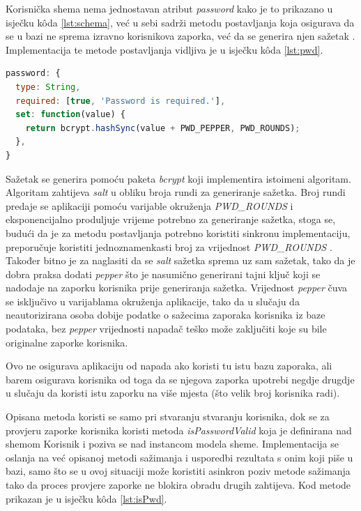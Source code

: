 \documentclass[times, utf8, diplomski, numeric]{fer}
\newcommand{\razmakp}{\vspace{18pt}}
\newcommand{\razmaks}{\vspace{10pt}}
\begin{document}
Korisnička shema nema jednostavan atribut \emph{password} kako je to prikazano u isječku kôda \ref{lst:schema}, već u sebi sadrži metodu postavljanja  koja osigurava da se u bazi ne sprema izravno korisnikova zaporka, već da se generira njen sažetak .
Implementacija te metode postavljanja vidljiva je u isječku kôda \ref{lst:pwd}.

\razmakp %
\begin{lstlisting}[language=JavaScript, caption={Attribut \emph{password} od sheme Korisnik}, label={lst:pwd}]
password: {
  type: String,
  required: [true, 'Password is required.'],
  set: function(value) {
    return bcrypt.hashSync(value + PWD_PEPPER, PWD_ROUNDS);
  },
}
\end{lstlisting}
\razmaks

Sažetak se generira pomoću paketa \emph{bcrypt} koji implementira istoimeni algoritam.
Algoritam zahtijeva \emph{salt} u obliku broja rundi za generiranje sažetka.
Broj rundi predaje se aplikaciji pomoću varijable okruženja \emph{PWD\_ROUNDS} i eksponencijalno produljuje vrijeme potrebno za generiranje sažetka, stoga se, budući da je za metodu postavljanja potrebno koristiti sinkronu implementaciju, preporučuje koristiti jednoznamenkasti broj za vrijednost \emph{PWD\_ROUNDS} \citep{bcrypt}.
Također bitno je za naglasiti da se \emph{salt} sažetka sprema uz sam sažetak, tako da je dobra praksa dodati \emph{pepper} što je nasumično generirani tajni ključ koji se nadodaje na zaporku korisnika prije generiranja sažetka.
Vrijednost \emph{pepper} čuva se isključivo u varijablama okruženja aplikacije, tako da u slučaju da neautorizirana osoba dobije podatke o sažecima zaporaka korisnika iz baze podataka, bez \emph{pepper} vrijednosti napadač teško može zaključiti koje su bile originalne zaporke korisnika.

Ovo ne osigurava aplikaciju od napada ako koristi tu istu bazu zaporaka, ali barem osigurava korisnika od toga da se njegova zaporka upotrebi negdje drugdje u slučaju da koristi istu zaporku na više mjesta (što velik broj korisnika radi).

\razmakp

Opisana metoda koristi se samo pri stvaranju stvaranju korisnika, dok se za provjeru zaporke korisnika koristi metoda \emph{isPasswordValid} koja je definirana nad shemom Korisnik i poziva se nad instancom modela sheme.
Implementacija se oslanja na već opisanoj metodi sažimanja i usporedbi rezultata s onim koji piše u bazi, samo što se u ovoj situaciji može koristiti asinkron poziv metode sažimanja tako da proces provjere zaporke ne blokira obradu drugih zahtijeva. 
Kod metode prikazan je u isječku kôda \ref{lst:isPwd}.
\end{document}
